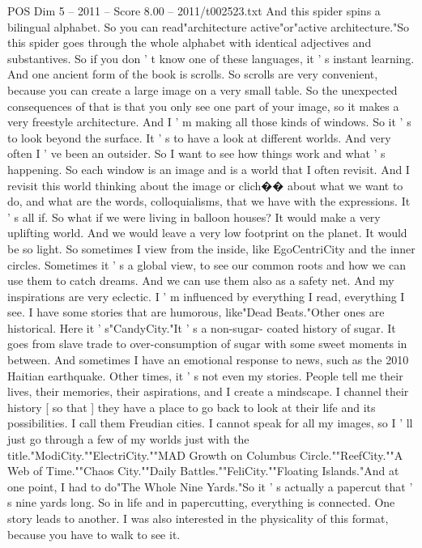 \begin{textsample}{POS Dim 5 – 2011 – Score 8.00 – 2011/t002523.txt}
And this spider spins a bilingual alphabet.
So you can read"architecture active"or"active architecture."So this spider goes through the whole alphabet with identical adjectives and substantives.
So if you don ' t know one of these languages, it ' s instant learning.
And one ancient form of the book is scrolls.
So scrolls are very convenient, because you can create a large image on a very small table.
So the unexpected consequences of that is that you only see one part of your image, so it makes a very freestyle architecture.
And I ' m making all those kinds of windows.
So it ' s to look beyond the surface.
It ' s to have a look at different worlds.
And very often I ' ve been an outsider.
So I want to see how things work and what ' s happening.
So each window is an image and is a world that I often revisit.
And I revisit this world thinking about the image or clich{\EmojiFont �}{\EmojiFont �} about what we want to do, and what are the words, colloquialisms, that we have with the expressions.
It ' s all if.
So what if we were living in balloon houses?
It would make a very uplifting world.
And we would leave a very low footprint on the planet.
It would be so light.
So sometimes I view from the inside, like EgoCentriCity and the inner circles.
Sometimes it ' s a global view, to see our common roots and how we can use them to catch dreams.
And we can use them also as a safety net.
And my inspirations are very eclectic.
I ' m influenced by everything I read, everything I see.
I have some stories that are humorous, like"Dead Beats."Other ones are historical.
Here it ' s"CandyCity."It ' s a non-sugar- coated history of sugar.
It goes from slave trade to over-consumption of sugar with some sweet moments in between.
And sometimes I have an emotional response to news, such as the 2010 Haitian earthquake.
Other times, it ' s not even my stories.
People tell me their lives, their memories, their aspirations, and I create a mindscape.
I channel their history [ so that ] they have a place to go back to look at their life and its possibilities.
I call them Freudian cities.
I cannot speak for all my images, so I ' ll just go through a few of my worlds just with the title."ModiCity.""ElectriCity.""MAD Growth on Columbus Circle.""ReefCity.""A Web of Time.""Chaos City.""Daily Battles.""FeliCity.""Floating Islands."And at one point, I had to do"The Whole Nine Yards."So it ' s actually a papercut that ' s nine yards long.
So in life and in papercutting, everything is connected.
One story leads to another.
I was also interested in the physicality of this format, because you have to walk to see it.

\end{textsample}
